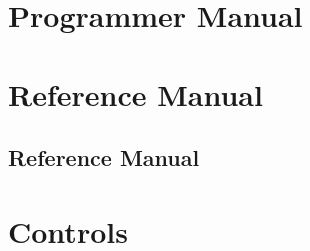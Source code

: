 \documentclass{dabcclass}
\begin{document}
\part{Programmer Manual}
 \cleardoublepage
\part{Reference Manual}
\chapter{Reference Manual}
 \cleardoublepage
\part{Controls}
 \cleardoublepage

\thispagestyle{empty}
 \cleardoublepage

\end{document}
